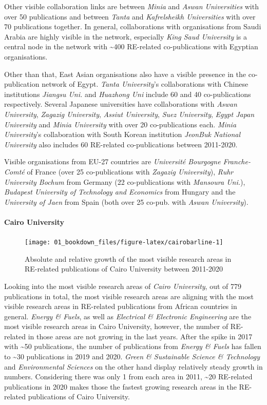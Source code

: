 \documentclass[
]{book}
\begin{document}
Other visible collaboration links are between \emph{Minia} and \emph{Aswan Universities} with over 50 publications and between \emph{Tanta} and \emph{Kafrelsheikh Universities} with over 70 publications together. In general, collaborations with organisations from Saudi Arabia are highly visible in the network, especially \emph{King Saud University} is a central node in the network with \textasciitilde400 RE-related co-publications with Egyptian organisations.

Other than that, East Asian organisations also have a visible presence in the co-publication network of Egypt. \emph{Tanta University}'s collaborations with Chinese institutions \emph{Jiangsu Uni.} and \emph{Huazhong Uni} include 60 and 40 co-publications respectively. Several Japanese universities have collaborations with \emph{Aswan University}, \emph{Zagazig University}, \emph{Assiut University}, \emph{Suez University}, \emph{Egypt Japan University} and \emph{Minia University} with over 20 co-publications each. \emph{Minia University}'s collaboration with South Korean institution \emph{JeonBuk National University} also includes 60 RE-related co-publications between 2011-2020.

Visible organisations from EU-27 countries are \emph{Université Bourgogne Franche-Comté} of France (over 25 co-publications with \emph{Zagazig University}), \emph{Ruhr University Bochum} from Germany (22 co-publications with \emph{Mansoura Uni.}), \emph{Budapest University of Technology and Economics} from Hungary and the \emph{University of Jaen} from Spain (both over 25 co-pub. with \emph{Aswan University}).

\hypertarget{cairo-university}{%
\paragraph{Cairo University}\label{cairo-university}}

\begin{figure}
\texttt{[image: 01\_bookdown\_files/figure-latex/cairobarline-1]} \caption{Absolute and relative growth of the most visible research areas in RE-related publications of Cairo University between 2011-2020}\label{fig:cairobarline}
\end{figure}

Looking into the most visible research areas of \emph{Cairo University}, out of 779 publications in total, the most visible research areas are aligning with the most visible research areas in RE-related publications from African countries in general. \emph{Energy \& Fuels}, as well as \emph{Electrical \& Electronic Engineering} are the most visible research areas in Cairo University, however, the number of RE-related in those areas are not growing in the last years. After the spike in 2017 with \textasciitilde50 publications, the number of publications from \emph{Energy \& Fuels} has fallen to \textasciitilde30 publications in 2019 and 2020. \emph{Green \& Sustainable Science \& Technology} and \emph{Environmental Sciences} on the other hand display relatively steady growth in numbers. Considering there was only 1 from each area in 2011, \textasciitilde20 RE-related publications in 2020 makes those the fastest growing research areas in the RE-related publications of Cairo University.
\end{document}
